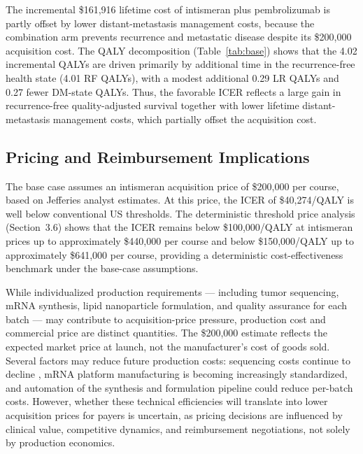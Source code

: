 \documentclass[12pt,a4paper]{article}
\begin{document}
The incremental \$161,916 lifetime cost of intismeran plus \mbox{pembrolizumab} is partly offset by lower distant-metastasis management costs, because the combination arm prevents recurrence and metastatic disease despite its \$200,000 acquisition cost. The QALY decomposition (Table~\ref{tab:base}) shows that the 4.02 incremental QALYs are driven primarily by additional time in the recurrence-free health state (4.01 RF QALYs), with a modest additional 0.29 LR QALYs and 0.27 fewer DM-state QALYs. Thus, the favorable ICER reflects a large gain in recurrence-free quality-adjusted survival together with lower lifetime distant-metastasis management costs, which partially offset the acquisition cost.

\subsection{Pricing and Reimbursement Implications}

The base case assumes an intismeran acquisition price of \$200,000 per course, based on Jefferies analyst estimates. At this price, the ICER of \$40,274/QALY is well below conventional US thresholds. The deterministic threshold price analysis (Section~3.6) shows that the ICER remains below \$100,000/QALY at intismeran prices up to approximately \$440,000 per course and below \$150,000/QALY up to approximately \$641,000 per course, providing a deterministic cost-effectiveness benchmark under the base-case assumptions.

While individualized production requirements --- including tumor sequencing, mRNA synthesis, lipid nanoparticle formulation, and quality assurance for each batch --- may contribute to acquisition-price pressure, production cost and commercial price are distinct quantities. The \$200,000 estimate reflects the expected market price at launch, not the manufacturer's cost of goods sold. Several factors may reduce future production costs: sequencing costs continue to decline \cite{schwarze2020}, mRNA platform manufacturing is becoming increasingly standardized, and automation of the synthesis and formulation pipeline could reduce per-batch costs. However, whether these technical efficiencies will translate into lower acquisition prices for payers is uncertain, as pricing decisions are influenced by clinical value, competitive dynamics, and reimbursement negotiations, not solely by production economics.
\end{document}
